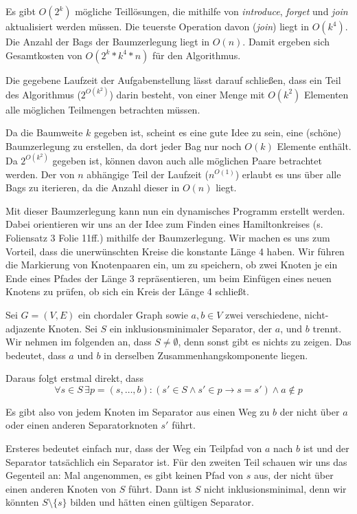 Es gibt $O(2^k)$ mögliche Teillösungen, die mithilfe von \textit{introduce}, \textit{forget} und \textit{join} aktualisiert werden müssen. Die teuerste Operation davon (\textit{join}) liegt in $O(k^4)$. Die Anzahl der Bags der Baumzerlegung liegt in $O(n)$. Damit ergeben sich Gesamtkosten von $O(2^k*k^4*n)$ für den Algorithmus.

\how

Die gegebene Laufzeit der Aufgabenstellung lässt darauf schließen, dass ein Teil des Algorithmus ($2^{O(k^2)}$) darin besteht, von einer Menge mit $O(k^2)$ Elementen alle möglichen Teilmengen betrachten müssen.

Da die Baumweite $k$ gegeben ist, scheint es eine gute Idee zu sein, eine (schöne) Baumzerlegung zu erstellen, da dort jeder Bag nur noch $O(k)$ Elemente enthält. Da $2^{O(k^2)}$ gegeben ist, können davon auch alle möglichen Paare betrachtet werden. Der von $n$ abhängige Teil der Laufzeit ($n^{O(1)}$) erlaubt es uns über alle Bags zu iterieren, da die Anzahl dieser in $O(n)$ liegt.

Mit dieser Baumzerlegung kann nun ein dynamisches Programm erstellt werden. Dabei orientieren wir uns an der Idee zum Finden eines Hamiltonkreises (s. Foliensatz 3 Folie 11ff.) mithilfe der Baumzerlegung. Wir machen es uns zum Vorteil, dass die unerwünschten Kreise die konstante Länge 4 haben. Wir führen die Markierung von Knotenpaaren ein, um zu speichern, ob zwei Knoten je ein Ende eines Pfades der Länge 3 repräsentieren, um beim Einfügen eines neuen Knotens zu prüfen, ob sich ein Kreis der Länge 4 schließt.


\subexercise
\label{sec:sep-clique}

Sei $G = (V,E)$ ein chordaler Graph sowie $a,b \in V$ zwei verschiedene, nicht-adjazente Knoten. Sei $S$ ein inklusionsminimaler Separator, der $a$, und $b$ trennt.
Wir nehmen im folgenden an, dass $S \neq \emptyset$, denn sonst gibt es nichts zu zeigen. Das bedeutet, dass $a$ und $b$ in derselben Zusammenhangskomponente liegen.

Daraus folgt erstmal direkt, dass $$\forall s \in S \, \exists p = (s, \dots, b) \colon (s' \in S \wedge s' \in p \rightarrow s = s') \wedge a \notin p$$

Es gibt also von jedem Knoten im Separator aus einen Weg zu $b$ der nicht über $a$ oder einen anderen Separatorknoten $s'$ führt.

Ersteres bedeutet einfach nur, dass der Weg ein Teilpfad von $a$ nach $b$ ist und der Separator tatsächlich ein Separator ist. Für den zweiten Teil schauen wir uns das Gegenteil an:
Mal angenommen, es gibt keinen Pfad von $s$ aus, der nicht über einen anderen Knoten von $S$ führt. Dann ist $S$ nicht inklusionsminimal, denn wir könnten $S \setminus \{s\}$ bilden und hätten einen gültigen Separator.

